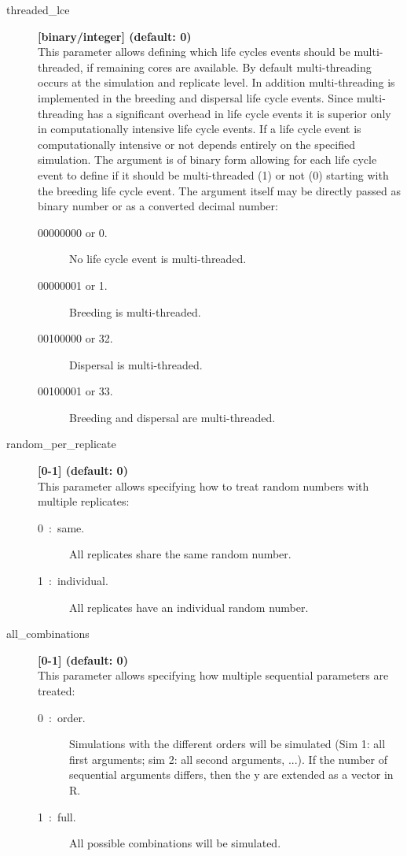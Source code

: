 \documentclass[letterpaper,12pt,oneside]{book}
\begin{document}
\begin{description}
\item[threaded\_lce] \textbf{[binary/integer] (default: 0)}\\
This parameter allows defining which life cycles events should be multi-threaded, if remaining cores are available. By default multi-threading occurs at the simulation and replicate level. In addition multi-threading is implemented in the breeding and dispersal life cycle events. Since multi-threading has a significant overhead in life cycle events it is superior only in computationally intensive life cycle events. If a life cycle event is computationally intensive or not depends entirely on the specified simulation. The argument is of binary form allowing for each life cycle event to define if it should be multi-threaded (1) or not (0) starting with the breeding life cycle event. The argument itself may be directly passed as binary number or as a converted decimal number:
\begin{description}
	\item[00000000 or 0.] No life cycle event is multi-threaded.
	\item[00000001 or 1.] Breeding is multi-threaded.
	\item[00100000 or 32.] Dispersal is multi-threaded.
	\item[00100001 or 33.] Breeding and dispersal are multi-threaded.
\end{description}

 


\item[random\_per\_replicate] \textbf{[0-1] (default: 0)}\\
This parameter allows specifying how to treat random numbers with multiple replicates:
\begin{description}
	\item[0~:~same.] All replicates share the same random number.
	\item[1~:~individual.] All replicates have an individual random number. 
\end{description}

\item[all\_combinations] \textbf{[0-1] (default: 0)}\\
This parameter allows specifying how multiple sequential parameters are treated:
\begin{description}
	\item[0~:~order.] Simulations with the different orders will be simulated (Sim 1: all first arguments; sim 2: all second arguments, ...). If the number of sequential arguments differs, then the y are extended as a vector in R.
	\item[1~:~full.] All possible combinations will be simulated. 
\end{description}


\end{description}
\end{document}
